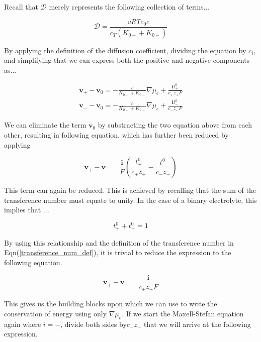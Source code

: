 \documentclass[lettersize,journal]{IEEEtran}
\begin{document}
\noindent Recall that $\mathscr{D}$ merely represents the following collection of terms...

\begin{equation}
\mathscr{D}=\frac{v R T c_{0} c}{c_{T}\left(K_{0+}+K_{0-}\right)}
\end{equation}

\noindent By applying the definition of the diffusion coefficient, dividing the equation by $c_i$, and simplifying that we can express both the positive and negative components as...

\begin{equation}\label{rel_v_pos_n_neg}
\begin{array}{l}
\mathbf{v}_{+}-\mathbf{v}_{0}=-\frac{c}{K_{0+}+K_{0-}} \nabla \mu_{e}+\frac{\mathbf{i} t_{+}^{0}}{c_{+} z_{+} F} \\
\mathbf{v}_{-}-\mathbf{v}_{0}=-\frac{c}{K_{0+}+K_{0-}} \nabla \mu_{e}+\frac{\mathbf{i} t_{-}^{0}}{c_{-} z_{-} F}
\end{array}
\end{equation}

\noindent We can eliminate the term $\mathbf{v}_0$ by substracting the two equation above from each other, resulting in following equation, which has further been reduced by applying

\begin{equation}
\mathbf{v}_{+}-\mathbf{v}_{-} =\frac{\mathbf{i}}{F}\left(\frac{t_{+}^{0}}{c_{+} z_{+}}-\frac{t_{-}^{0}}{c_{-} z_{-}}\right)
\end{equation}


\noindent This term can again be reduced. This is achieved by recalling that the sum of the transference number must equate to unity. In the case of a binary electrolyte, this implies that ...

\begin{equation}
  t_{+}^{0} + t_{-}^{0} = 1
\end{equation}

\noindent By using this relationship and the definition of the transference number in Eqn(\ref{transference_num_def}), it is trivial to reduce the expression to the following equation.



\begin{equation}\label{rel_V}
\mathbf{v}_{+}-\mathbf{v}_{-} =\frac{\mathbf{i}}{c_{+} z_{+} F}
\end{equation}

\noindent This gives us the building blocks upon which we can use to write the conservation of energy using only $\nabla \mu_e$. If we start the Maxell-Stefan equation again where $i = -$, divide both sides by$c_{-}z_{-}$ that we will arrive at the following expression.
\end{document}
